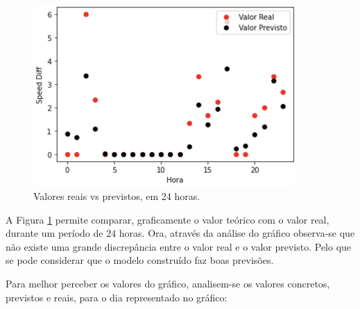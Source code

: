 \documentclass[a4paper, 12pt]{article}
\begin{document}
\begin{figure}[H]
	\centering
	\includegraphics[width=10cm]{resultados/real_prev_1.png}
	\caption{Valores reais vs previstos, em 24 horas.}
	\label{figure:real_prev_1}
\end{figure}

A Figura \ref{figure:real_prev_1} permite comparar, graficamente o valor teórico com o valor real, durante um período de $24$ horas. Ora, através da análise do gráfico observa-se que não existe uma grande discrepância entre o valor real e o valor previsto. Pelo que se pode considerar que o modelo construído faz boas previsões.

Para melhor perceber os valores do gráfico, analisem-se os valores concretos, previstos e reais, para o dia representado no gráfico:
\end{document}
